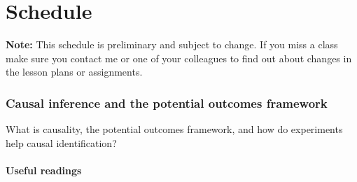 \documentclass[10pt]{article}
\begin{document}
 \part*{Schedule}

        \textbf{Note: } This schedule is preliminary and subject to change. If
        you miss a class make sure you contact me or one of your colleagues to
        find out about changes in the lesson plans or assignments.

\titleformat{\subsection}[hang]{\sffamily\bfseries}{\thesubsection}{}{}{}
\titleformat{\subsubsection}[hang]{\small\sffamily\bfseries}{\thesubsubsection}{}{}{}

\section{Causal inference and the potential outcomes framework}

What is causality, the potential outcomes framework, and how do experiments help causal identification?
\subsection{Useful readings}
\end{document}
